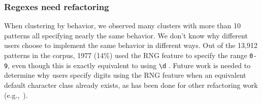 \subsubsection{Regexes need refactoring}
When clustering by behavior, we observed many clusters with more than 10 patterns all specifying nearly the same behavior.  We don't know why different users choose to implement the same behavior in different ways.  Out of the 13,912 patterns in the corpus, 1977 (14\%) used the RNG feature to specify the range \verb•0-9•, even though this is exactly equivalent to using \verb•\d• .  Future work is needed to determine why users specify digits using the RNG feature when an equivalent default character class already exists, as has been done for other refactoring work (e.g.,~\cite{StoleeTSE2013}). 














